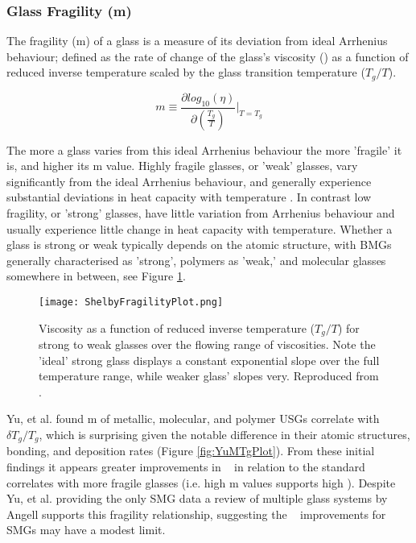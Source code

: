 \documentclass[draft,a4paper,12pt,oneside]{report}%
\begin{document}
\subsubsection{Glass Fragility (m)}
The fragility (m)  of a glass is a measure of its deviation from ideal Arrhenius behaviour; defined as the rate of change of the glass's viscosity (\n) as a function of reduced inverse temperature scaled by the glass transition temperature ($T_{g}/T$).

\begin{equation}
m \equiv 
\frac{\partial log_{10} (\eta)}
{\partial (\frac{T_{g}} {T})}
\biggr|_{T=T_{g}}
\label{equ:Fragility}
\end{equation}

The more a glass varies from this ideal Arrhenius behaviour the more 'fragile' it is, and higher its m value. Highly fragile glasses, or 'weak' glasses, vary significantly from the ideal Arrhenius behaviour, and generally experience substantial deviations in heat capacity with temperature \cite{Shelby2005, Angell1995}. In contrast low fragility, or 'strong' glasses, have little variation from Arrhenius behaviour and usually experience little change in heat capacity with temperature. Whether a glass is strong or weak typically depends on the atomic structure, with BMGs generally characterised as 'strong', polymers as 'weak,' and molecular glasses somewhere in between, see Figure \ref{fig:ShelbyFragPlot}. 

\begin{figure}[htbp]
	\centering
	\texttt{[image: ShelbyFragilityPlot.png]}
	\caption[Glass Fragility]{Viscosity as a function of reduced inverse temperature ($T_{g}/T$) for strong to weak glasses over the flowing range of viscosities. Note the 'ideal' strong glass displays a constant exponential slope over the full temperature range, while weaker glass' slopes very. Reproduced from \cite{Shelby2005}.}
	\label{fig:ShelbyFragPlot}
\end{figure}

Yu, et al. \cite{Yu2013} found m of metallic, molecular, and polymer USGs correlate with $\delta T_{g}/T_{g}$, which is surprising given the notable difference in their atomic structures, bonding, and deposition rates (Figure \ref{fig:YuMTgPlot}). From these initial findings it appears greater improvements in \dTg~ in relation to the standard \Tg~ correlates with more fragile glasses (i.e. high m values supports high \dTg). Despite  Yu, et al. \cite{Yu2013} providing the only SMG data a review of multiple glass systems by Angell \cite{Angell2014} supports this fragility relationship,  suggesting the  \dTg~ improvements for SMGs may have a modest limit. 
\end{document}
